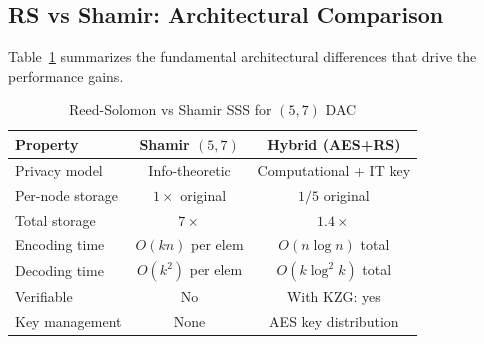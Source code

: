 \subsection{RS vs Shamir: Architectural Comparison}

Table~\ref{tab:rs-vs-shamir} summarizes the fundamental architectural
differences that drive the performance gains.

\begin{table}[t]
\centering
\caption{Reed-Solomon vs Shamir SSS for $(5,7)$ DAC}
\label{tab:rs-vs-shamir}
\begin{tabular}{@{}lcc@{}}
\toprule
\textbf{Property} & \textbf{Shamir $(5,7)$} & \textbf{Hybrid (AES+RS)} \\
\midrule
Privacy model     & Info-theoretic   & Computational + IT key \\
Per-node storage  & $1\times$ original & $1/5$ original \\
Total storage     & $7\times$        & $1.4\times$ \\
Encoding time     & $O(kn)$ per elem & $O(n \log n)$ total \\
Decoding time     & $O(k^2)$ per elem & $O(k \log^2 k)$ total \\
Verifiable        & No               & With KZG: yes \\
Key management    & None             & AES key distribution \\
\bottomrule
\end{tabular}
\end{table}
